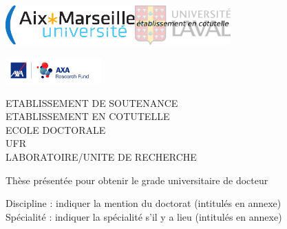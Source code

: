 \makeatletter
  \begin{titlepage}
\begin{center}
	\begin{minipage}[c]{0.70\linewidth}
		\raggedright \includegraphics[height=1.5cm]{logo_amu}\quad\includegraphics[height=1.5cm]{logo_cotutelle}
	\end{minipage}\hfill
	\begin{minipage}[c]{0.30\linewidth}
		\raggedleft \includegraphics[height=1cm]{axa-fund-corpo}
	\end{minipage}\hfill 
\end{center}
\begin{flushleft}
	\vspace{0.2cm}
	\LARGE ETABLISSEMENT DE SOUTENANCE\\
	\LARGE\textcolor{black!50}{ETABLISSEMENT EN COTUTELLE}\\
	\Large ECOLE DOCTORALE\\
	\vspace{0.2cm}
	\normalsize UFR\\
	\vspace{0.2cm}
	LABORATOIRE/UNITE DE RECHERCHE\\
    \begin{center}
		\vspace{2cm}
		Thèse présentée pour obtenir le grade universitaire de docteur\\
    \end{center}
	\vspace{0.5cm}
    Discipline : indiquer la mention du doctorat (intitulés en annexe)\\
    Spécialité : indiquer la spécialité s'il y a lieu (intitulés en annexe)\\
    \begin{center}
        \vspace{0.5cm}

\end{center}
\end{flushleft}
\end{titlepage}
